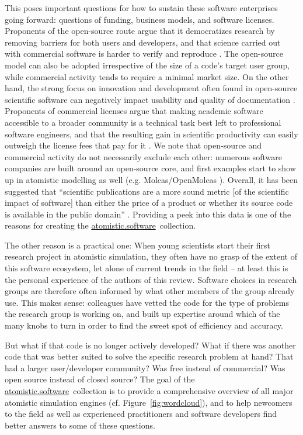 \documentclass[9pt,review]{livecoms}
\newcommand{\atsoft}{\href{https://atomistic.software}{atomistic.software}\ }
\begin{document}
This poses important questions for how to sustain these software enterprises going forward: questions of funding, business models, and software licenses.
Proponents of the open-source route argue that it democratizes research by removing barriers for both users and developers, and that science carried out with commercial software is harder to verify and reproduce \cite{Stodden2009,Gezelter2015}.
The open-source model can also be adopted irrespective of the size of a code's target user group, while commercial activity tends to require a minimal market size.
On the other hand, the strong focus on innovation and development often found in open-source scientific software can negatively impact usability and quality of documentation \cite{Swarts2019}.
Proponents of commercial licenses argue that making academic software accessible to a broader community is a technical task best left to professional software engineers, and that the resulting gain in scientific productivity can easily outweigh the license fees that pay for it \cite{Krylov2015}.
We note that open-source and commercial activity do not necessarily exclude each other: numerous software companies are built around an open-source core, and first examples start to show up in atomistic modelling as well (e.g. Molcas/OpenMolcas \cite{Fdez.Galvan2019}).
Overall, it has been suggested that ``scientific publications are a more sound metric [of the scientific impact of software] than either the price of a product or whether its source code is available in the public domain'' \cite{Krylov2015}.
Providing a peek into this data is one of the reasons for creating the \atsoft collection.


The other reason is a practical one: 
When young scientists start their first research project in atomistic simulation, they often have no grasp of the extent of this software ecosystem, let alone of current trends in the field -- at least this is the personal experience of the authors of this review.
Software choices in research groups are therefore often informed by what other members of the group already use.
This makes sense: colleagues have vetted the code for the type of problems the research group is working on, and built up expertise around which of the many knobs to turn in order to find the sweet spot of efficiency and accuracy.

But what if that code is no longer actively developed?
What if there was another code that was better suited to solve the specific research problem at hand? 
That had a larger user/developer community? 
Was free instead of commercial? 
Was open source instead of closed source? 
The goal of the \atsoft collection is to provide a comprehensive overview of all major atomistic simulation engines (cf. Figure~\ref{fig:wordcloud}), and to help newcomers to the field as well as experienced practitioners and software developers find better answers to some of these questions.
\end{document}
